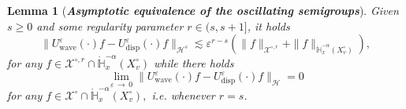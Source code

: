 \documentclass[10pt]{amsart}
\newtheorem{lemm}[theo]{Lemma}\newtheorem{prop}[theo]{Proposition}\newtheorem{coro}[theo]{Corollary}\newtheorem{conj}[theo]{Conjecture}
\theoremstyle{definition}\newtheorem{defi}[theo]{Definition}\newtheorem{rema}[theo]{Remark}\newtheorem{exam}[theo]{Example}\newtheorem{exem}[theo]{Example}\newtheorem{nota}[theo]{Notation}
\newcommand{\Wave}{\mathrm{wave}}
\newcommand{\disp}{\mathrm{disp}}
\newcommand{\bbH}{\mathbb{H}}
\newcommand{\XX}{\mathcal{X}}
\newcommand{\HHH}{\mathscr{H}}
\newcommand{\SSSs}{\HHH}
\newcommand{\rSSSs}[1]{\HHH^{#1}}
\newcommand{\Slm}{X^{\circ}}
\newcommand{\SSlm}{\XX^{\circ}}
\newcommand{\rSSlm}[1]{\XX^{{\circ}, #1}}
\renewcommand*\ge{\geqslant}
\newcommand*\eps{{\varepsilon}}
\begin{document}
\begin{lemm}[\emph{\textbf{Asymptotic equivalence of the oscillating semigroups}}]\label{lem:asymptotic_equiv_oscillating_semigroup}
Given $s \ge0$ and some regularity parameter $r \in (s, s+1]$, it holds
\begin{equation}\label{eq:asymptotic_equiv_oscillating_reg}
\| U^\eps_\Wave(\cdot) f - U^\eps_\disp(\cdot) f \|_{\rSSSs{s}} \lesssim \eps^{r-s} \left(\| f \|_{\rSSlm{r}} + \| f \|_{\dot{\bbH}^{-\alpha}_x (\Slm_v) } \right),
\end{equation}
for any $f \in \rSSlm{r} \cap \dot{\bbH}_x^{-\alpha}(\Slm_v)$ while there holds
\begin{equation}\label{eq:asymptotic_equiv_oscillating_general}
\lim_{\eps\,\to\,0}\| U^\eps_\Wave(\cdot) f - U^\eps_\disp(\cdot) f \|_{\SSSs} =0
\end{equation}
for any $f \in \SSlm \cap \dot{\bbH}^{-\alpha}_x (\Slm_v),$ i.e. whenever $r=s$.
\end{lemm}
\end{document}

